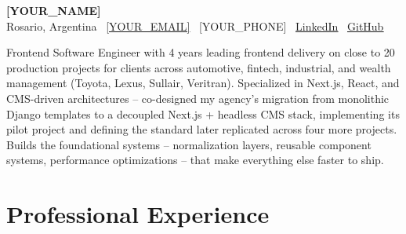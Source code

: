 \documentclass[10.5pt,a4paper]{article}
\newcommand{\cvlink}[2]{\href{#1}{\underline{#2}}}
\begin{document}
\begin{center}
{\LARGE \bfseries [YOUR_NAME]}\\[3pt]
Rosario, Argentina \textbullet\ \cvlink{mailto:[YOUR_EMAIL]}{[YOUR_EMAIL]} \textbullet\ [YOUR_PHONE] \textbullet\ \cvlink{https://www.linkedin.com/in/gabriel-mensi/}{LinkedIn} \textbullet\ \cvlink{https://github.com/GabrielMensi}{GitHub}
\end{center}
\vspace{2pt}
{\titlerule[0.6pt]}
\vspace{5pt}

\noindent Frontend Software Engineer with 4 years leading frontend delivery on close to 20 production projects for clients across automotive, fintech, industrial, and wealth management (Toyota, Lexus, Sullair, Veritran). Specialized in Next.js, React, and CMS-driven architectures -- co-designed my agency's migration from monolithic Django templates to a decoupled Next.js + headless CMS stack, implementing its pilot project and defining the standard later replicated across four more projects. Builds the foundational systems -- normalization layers, reusable component systems, performance optimizations -- that make everything else faster to ship.

\vspace{2pt}

\section{Professional Experience}
\end{document}
